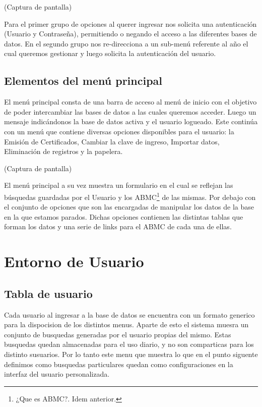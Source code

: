 \documentclass[a4paper,10pt]{article}
\begin{document}
(Captura de pantalla)

Para el primer grupo de opciones al querer ingresar nos solicita una autenticación (Usuario y Contraseña), permitiendo o negando el acceso a las diferentes bases de datos. En el segundo grupo nos re-direcciona a un sub-menú referente al año el cual queremos gestionar y luego solicita la autenticación del usuario. 
 
\subsection{Elementos del menú principal\label{ElementosDelMenuPrincipal}}

El menú principal consta de una barra de acceso al menú de inicio con el objetivo de poder intercambiar las bases de datos a las cuales queremos acceder. 
Luego un mensaje indicándonos la base de datos activa y el usuario logueado.
Este continúa con un menú que contiene diversas opciones disponibles para el usuario: la Emisión de Certificados, Cambiar la clave de ingreso, Importar datos, Eliminación de registros y la papelera.

(Captura de pantalla)

El menú principal a su vez muestra un formulario en el cual se reflejan las búsquedas guardadas por el Usuario y los ABMC\footnote{¿Que es ABMC?. Idem anterior.} de las mismas. Por debajo con el conjunto de opciones que son las encargadas de manipular los datos de la base en la que estamos parados.
Dichas opciones contienen las distintas tablas que forman los datos y una serie de links para el ABMC de cada una de ellas.



\section{Entorno de Usuario}
\subsection{Tabla de usuario}
Cada usuario al ingresar a la base de datos se encuentra con un formato generico para la dispocision de los distintos menus. Aparte de esto el sistema muesra un conjunto de busquedas generadas por el usuario propias del mismo. Estas busquedas quedan almacenadas para el uso diario, y no son comparticas para los distinto susuarios. Por lo tanto este menu que muestra lo que en el punto siguente definimos como busquedas particulares quedan como configuraciones en la interfaz del usuario personalizada.
\end{document}
